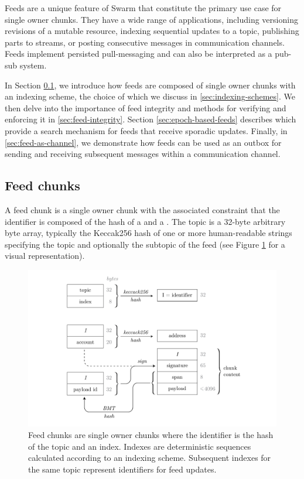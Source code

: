 \green{}

Feeds are a unique feature of Swarm that constitute the primary use case for single owner chunks. They have a wide range of applications, including versioning revisions of a mutable resource, indexing sequential updates to a topic, publishing parts to streams, or posting consecutive messages in communication channels. Feeds implement persisted pull-messaging and can also be interpreted as a pub-sub system.

In Section \ref{sec:feed-chunks}, we introduce how feeds are composed of single owner chunks with an indexing scheme, the choice of which we discuss in \ref{sec:indexing-schemes}. We then delve into the importance of feed integrity and methods for verifying and enforcing it in \ref{sec:feed-integrity}. Section \ref{sec:epoch-based-feeds} describes  which provide a search mechanism for feeds that receive sporadic updates. Finally, in \ref{sec:feed-as-channel}, we demonstrate how feeds can be used as an outbox for sending and receiving subsequent messages within a communication channel.


\subsection{Feed chunks \statusyellow}\label{sec:feed-chunks}

A feed chunk is a single owner chunk with the associated constraint that the identifier is composed of the hash of a  and a . The topic is a 32-byte arbitrary byte array, typically the Keccak256 hash of one or more human-readable strings specifying the topic and optionally the subtopic of the feed (see Figure \ref{fig:feed-chunk} for a visual representation). 


\begin{figure}[!ht]
\centering
\includegraphics[width=\textwidth]{fig/feed-chunk.pdf}
\caption[Feed chunk \statusgreen]{Feed chunks are single owner chunks where the identifier is the hash of the topic and an index. Indexes are deterministic sequences calculated according to an indexing scheme. Subsequent indexes for the same topic represent identifiers for feed updates.}
\label{fig:feed-chunk}
\end{figure}

